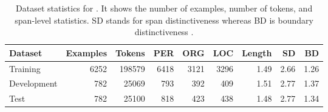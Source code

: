 \documentclass[../report.tex]{subfiles}
\begin{document}
\begin{table*}[t]
\centering
\begin{tabular}{@{}lrrrrrrrr@{}}
\toprule
Dataset     & Examples & Tokens &  PER  & ORG  & LOC  &  Length  & SD    & BD       \\ \midrule
Training    & 6252     & 198579 &  6418 & 3121 & 3296 &  1.49    & 2.66  & 1.26     \\
Development & 782      & 25069  &  793  & 392  & 409  &  1.51    & 2.77  & 1.37     \\
Test        & 782      & 25100  &  818  & 423  & 438  &  1.48    & 2.77  & 1.34     \\ \bottomrule
\end{tabular}
\caption{
    Dataset statistics for \tlunified{}.
    It shows the number of examples, number of tokens, and span-level statistics.
    SD stands for span distinctiveness whereas BD is boundary distinctiveness \cite{Papay2020DissectingSI}.
}
\label{table:dset_stats}
\end{table*}
\end{document}
